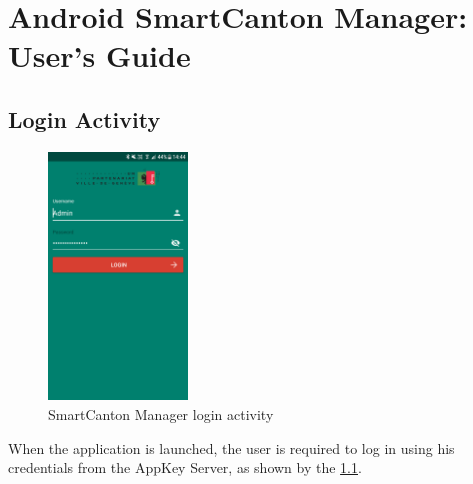 
\appendixpagenumbering %

\chapter{Android SmartCanton Manager: User's Guide} %
\label{AppendixAndroidAppUserGuide} 

\section{Login Activity}
\begin{figure}[ht!]
    \centering
    \includegraphics[width=0.33\textwidth]{Figures/Appendixes/Android/login_activity.png}
    \caption{SmartCanton Manager login activity}
    \label{fig_apdx-login_activity}
\end{figure}

When the application is launched, the user is required to log in using his credentials from the AppKey Server, as shown by the \cref{fig_apdx-login_activity}. 




\FloatBarrier
